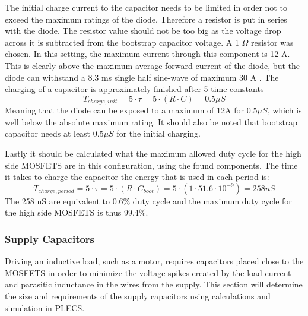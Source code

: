 The initial charge current to the capacitor needs to be limited in order not to exceed the maximum ratings of the diode.
Therefore a resistor is put in series with the diode.
The resistor value should not be too big as the voltage drop across it is subtracted from the bootstrap capacitor voltage.
A 1 $\Omega$ resistor was chosen. In this setting, the maximum current through this component is 12 A.
This is clearly above the maximum average forward current of the diode, but the diode can withstand a 8.3 ms single half sine-wave of maximum 30 A \cite{diode_ds}.
The charging of a capacitor is approximately finished after 5 time constants
\begin{equation}
T_{charge,init} = 5\cdot \tau = 5\cdot (R \cdot C) = 0.5 \mu S 
\end{equation}
Meaning that the diode can be exposed to a maximum of 12A for $0.5 \mu S $, which is well below the absolute maximum rating.
It should also be noted that bootstrap capacitor needs at least $0.5 \mu S $ for the initial charging.

Lastly it should be calculated what the maximum allowed duty cycle for the high side MOSFETS are in this configuration, using the found components.
The time it takes to charge the capacitor the energy that is used in each period is:
\begin{equation}
	T_{charge,period} = 5\cdot \tau = 5\cdot (R \cdot C_{boot}) = 5\cdot (1 \cdot  51.6 \cdot 10^{-9}) = 258 nS 
\end{equation}
The 258 nS are equivalent to 0.6\% duty cycle and the maximum duty cycle for the high side MOSFETS is thus 99.4\%.



\subsubsection{Supply Capacitors}
\label{ssub:sup_caps}
Driving an inductive load, such as a motor, requires capacitors placed close to the MOSFETS in order to minimize the voltage spikes created by the load current and parasitic inductance in the wires from the supply.
This section will determine the size and requirements of the supply capacitors using calculations and simulation in PLECS.

